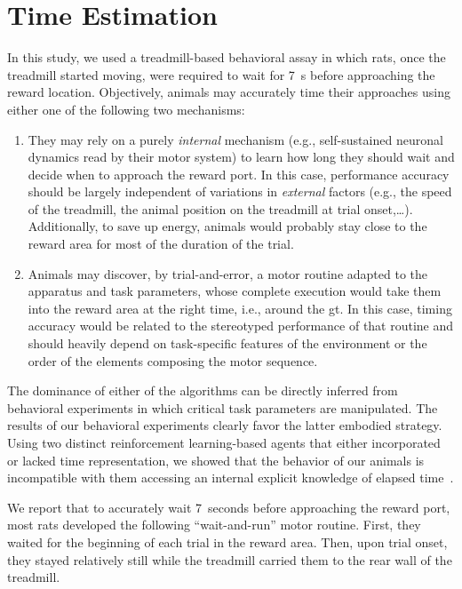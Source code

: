 \section{Time Estimation}
\label{ch:disscusion:time}

In this study, we used a treadmill-based behavioral assay in which rats, once the treadmill started moving, were required to wait for 7~s before approaching the reward location.
Objectively, animals may accurately time their approaches using either one of the following two mechanisms:
\begin{enumerate}[noitemsep, label=\Roman*.]
    \item They may rely on a purely \textit{internal} mechanism (e.g., self-sustained neuronal dynamics read by their motor system) to learn how long they should wait and decide when to approach the reward port.
    In this case, performance accuracy should be largely independent of variations in \textit{external} factors (e.g., the speed of the treadmill, the animal position on the treadmill at trial onset,\ldots).
    Additionally, to save up energy, animals would probably stay close to the reward area for most of the duration of the trial.
    \item Animals may discover, by trial-and-error, a motor routine adapted to the apparatus and task parameters, whose complete execution would take them into the reward area at the right time, i.e., around the \gls{gt}.
    In this case, timing accuracy would be related to the stereotyped performance of that routine and should heavily depend on task-specific features of the environment or the order of the elements composing the motor sequence.
\end{enumerate}
The dominance of either of the algorithms can be directly inferred from behavioral experiments in which critical task parameters are manipulated.
The results of our behavioral experiments clearly favor the latter embodied strategy.
Using two distinct reinforcement learning-based agents that either incorporated or lacked time representation, we showed that the behavior of our animals is incompatible with them accessing an internal explicit knowledge of elapsed time~\cite{Safaie2020PNAS}.
\par
We report that to accurately wait 7~seconds before approaching the reward port, most rats developed the following ``wait-and-run'' motor routine.
First, they waited for the beginning of each trial in the reward area.
Then, upon trial onset, they stayed relatively still while the treadmill carried them to the rear wall of the treadmill.
